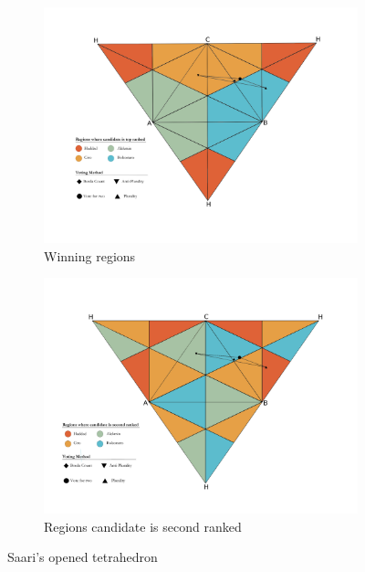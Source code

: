\documentclass[hidelinks,11pt]{article} \usepackage[utf8]{inputenc}
\begin{document}
\begin{figure}[!H] \centering
  \begin{subfigure}[b]{\textwidth} \centering
\includegraphics[width=\textwidth]{./images/top_ranked.png}
 \caption{Winning regions}
 \label{fig:ot_win}
\end{subfigure} \hfill
  \begin{subfigure}[b]{\textwidth} \centering
\includegraphics[width=\textwidth]{./images/second_ranked.png}
 \caption{Regions candidate is second ranked}
 \label{fig:ot_second}
\end{subfigure}
\caption{Saari's opened tetrahedron}
\label{fig:ot}
\end{figure}
\end{document}
